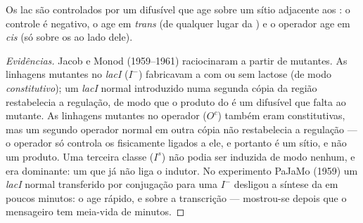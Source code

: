 \begin{proposition}\label{prop:b1:expression-control:jacobmonod}
Os  lac são controlados por um  difusível que age sobre um
sítio adjacente aos : o controle é negativo, o  age em
\emph{trans} (de qualquer lugar da ) e o operador age em
\emph{cis} (só sobre os  ao lado dele).
\end{proposition}
\begin{proof}[Evidências]
Jacob e Monod (1959--1961) raciocinaram a partir de mutantes. As
linhagens mutantes no \emph{lacI} ($I^-$) fabricavam a  com ou sem
lactose (de modo \emph{constitutivo}); um  \emph{lacI} normal
introduzido numa segunda cópia da região restabelecia a regulação, de
modo que o produto do  é um  difusível que falta ao
mutante. As linhagens mutantes no operador ($O^c$) também eram
constitutivas, mas um segundo operador normal em outra cópia não
restabelecia a regulação --- o operador só controla os  fisicamente
ligados a ele, e portanto é um sítio, e não um produto. Uma terceira
classe ($I^s$) não podia ser induzida de modo nenhum, e era dominante:
um  que já não liga o indutor. No experimento PaJaMo (1959) um
 \emph{lacI} normal transferido por conjugação para uma 
$I^-$ desligou a síntese da  em poucos minutos: o  age
rápido, e sobre a transcrição --- mostrou-se depois que o mensageiro tem
meia-vida de minutos.
\end{proof}

